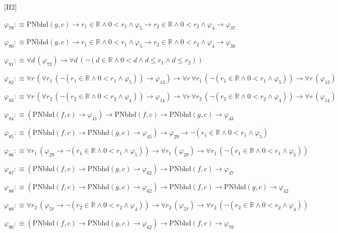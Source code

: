\begin{fullproof}{[H2]}
\begin{abbrevlist}
\item $\varphi_{79} :\equiv \mathrm{PNbhd}(g,c) \to r_{1} \in \mathbb{R} \land 0 < r_{1} \land \varphi_{5} \to r_{2} \in \mathbb{R} \land 0 < r_{2} \land \varphi_{4} \to \varphi_{37}$
\item $\varphi_{80} :\equiv \mathrm{PNbhd}(g,c) \to r_{1} \in \mathbb{R} \land 0 < r_{1} \land \varphi_{5} \to r_{2} \in \mathbb{R} \land 0 < r_{2} \land \varphi_{4} \to \varphi_{38}$
\item $\varphi_{81} :\equiv \forall d\,(\varphi_{72}) \to \forall d\,(\neg (d \in \mathbb{R} \land 0 < d \land d \leq r_{1} \land d \leq r_{2}))$
\item $\varphi_{82} :\equiv \forall r\,(\forall r_{1}\,(\neg (r_{1} \in \mathbb{R} \land 0 < r_{1} \land \varphi_{5})) \to \varphi_{13}) \to \forall r\,\forall r_{1}\,(\neg (r_{1} \in \mathbb{R} \land 0 < r_{1} \land \varphi_{5})) \to \forall r\,(\varphi_{13})$
\item $\varphi_{83} :\equiv \forall r\,(\forall r_{2}\,(\neg (r_{2} \in \mathbb{R} \land 0 < r_{2} \land \varphi_{4})) \to \varphi_{14}) \to \forall r\,\forall r_{2}\,(\neg (r_{2} \in \mathbb{R} \land 0 < r_{2} \land \varphi_{4})) \to \forall r\,(\varphi_{14})$
\item $\varphi_{84} :\equiv (\mathrm{PNbhd}(f,c) \to \varphi_{41}) \to \mathrm{PNbhd}(f,c) \to \mathrm{PNbhd}(g,c) \to \varphi_{43}$
\item $\varphi_{85} :\equiv (\mathrm{PNbhd}(f,c) \to \mathrm{PNbhd}(g,c) \to \varphi_{45}) \to \varphi_{29} \to \neg (r_{1} \in \mathbb{R} \land 0 < r_{1} \land \varphi_{5})$
\item $\varphi_{86} :\equiv \forall r_{1}\,(\varphi_{29} \to \neg (r_{1} \in \mathbb{R} \land 0 < r_{1} \land \varphi_{5})) \to \forall r_{1}\,(\varphi_{29}) \to \forall r_{1}\,(\neg (r_{1} \in \mathbb{R} \land 0 < r_{1} \land \varphi_{5}))$
\item $\varphi_{87} :\equiv (\mathrm{PNbhd}(f,c) \to \mathrm{PNbhd}(g,c) \to \varphi_{62}) \to \mathrm{PNbhd}(f,c) \to \varphi_{47}$
\item $\varphi_{88} :\equiv (\mathrm{PNbhd}(f,c) \to \mathrm{PNbhd}(g,c) \to \varphi_{62}) \to \mathrm{PNbhd}(f,c) \to \mathrm{PNbhd}(g,c) \to \varphi_{42}$
\item $\varphi_{89} :\equiv \forall r_{2}\,(\varphi_{57} \to \neg (r_{2} \in \mathbb{R} \land 0 < r_{2} \land \varphi_{4})) \to \forall r_{2}\,(\varphi_{57}) \to \forall r_{2}\,(\neg (r_{2} \in \mathbb{R} \land 0 < r_{2} \land \varphi_{4}))$
\item $\varphi_{90} :\equiv (\mathrm{PNbhd}(f,c) \to \mathrm{PNbhd}(g,c) \to \varphi_{62}) \to \mathrm{PNbhd}(f,c) \to \varphi_{79}$

\end{abbrevlist}
\end{fullproof}
